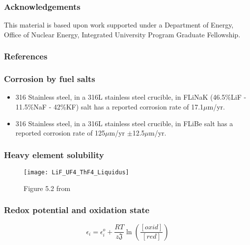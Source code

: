 \documentclass{beamer}
\begin{document}
\begin{frame}
\frametitle{Acknowledgements}

    This material is based upon work supported under a Department of Energy,
    Office of Nuclear Energy, Integrated University Program Graduate Fellowship.

\end{frame}

\begin{frame}[allowframebreaks]
\frametitle{References}

%

\end{frame}

\begin{frame}
\frametitle{Corrosion by fuel salts}

    \begin{itemize}
        \item 316 Stainless steel, in a 316L stainless steel crucible, in FLiNaK (46.5\%LiF - 11.5\%NaF - 42\%KF) salt has a reported corrosion rate of 17.1$\mu$m/yr. \cite{zheng_corrosion_2015}
        \item 316 Stainless steel, in a 316L stainless steel crucible, in FLiBe salt has a reported corrosion rate of 125$\mu$m/yr $\pm$12.5$\mu$m/yr. \cite{sellers_materials_2012}
    \end{itemize}

\end{frame}

\begin{frame}
\frametitle{Heavy element solubility}

    \begin{figure}
        \centering
        \texttt{[image: LiF\_UF4\_ThF4\_Liquidus]}
        \caption{Figure 5.2 from \cite{rosenthal_development_1972}}
        \label{fig:lifufthf_liquidus}
    \end{figure}

\end{frame}

\begin{frame}
\frametitle{Redox potential and oxidation state}

    \begin{equation}
    \label{Nernst}
        \epsilon_{i} = \epsilon_{i}^{o} + \frac{RT}{z\mathfrak{J}}\ln\left(\frac{[oxid]}{[red]}\right)
    \end{equation}

\end{frame}
\end{document}
